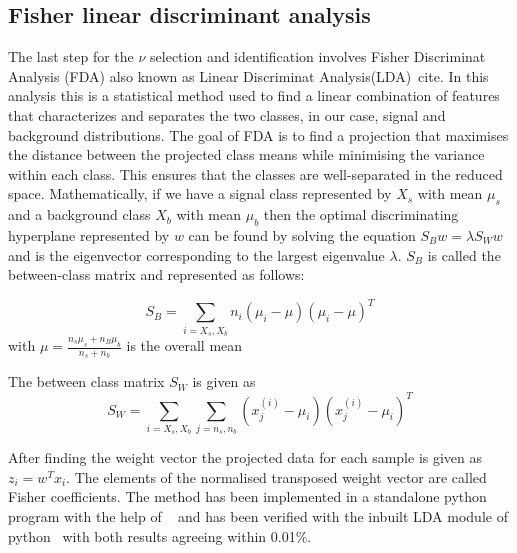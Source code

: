 \subsection{Fisher linear discriminant analysis}
\label{subsec:nu_sel_fisher}
The last step for the $\nu$ selection and identification involves Fisher Discriminat Analysis (FDA) also known as Linear Discriminat Analysis(LDA)~cite{}. In this analysis this is a statistical method used to find a linear combination of features that characterizes and separates the two classes, in our case, signal and background distributions. The goal of FDA is to find a projection that maximises the distance between the projected class means while minimising the variance within each class. This ensures that the classes are well-separated in the reduced space. Mathematically, if we have a signal class represented by $X_s$ with mean $\mu_s$ and a background class $X_b$ with mean $\mu_b$ then the optimal discriminating hyperplane represented by $w$ can be found by solving the equation $S_B w = \lambda S_W w$ and is the eigenvector corresponding to the largest eigenvalue $\lambda$. $S_B$ is called the between-class matrix and represented as follows:

\begin{equation}
  S_B = \sum_{i = X_s,X_b} n_i (\mu_i - \mu)(\mu_i - \mu)^T
\end{equation}
with $\mu = \frac{n_s \mu_s + n_B \mu_b}{n_s + n_b}$ is the overall mean 

The between class matrix $S_W$ is given as
\begin{equation}
  S_W = \sum_{i = X_s,X_b} \sum_{j = n_s,n_b } (x^{(i)}_j - \mu_i) (x^{(i)}_j - \mu_i)^T
\end{equation}

After finding the weight vector the projected data for each sample is given as $z_i = w^Tx_i$. The elements of the normalised transposed weight vector are called Fisher coefficients. The method has been implemented in a standalone python program with the help of ~\cite{} and has been verified with the inbuilt LDA module of python~\cite{} with both results agreeing within 0.01\%. 

